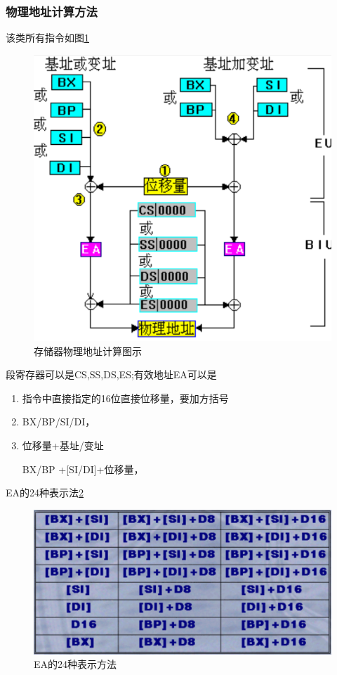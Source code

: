 \subsubsection{物理地址计算方法}
该类所有指令如图\ref{存储器物理地址计算图示}
\begin{figure}[H]\label{存储器物理地址计算图示}
    \centering 
    \includegraphics[scale=1]{part_指令系统/part_指令系统_pic/存储器物理地址计算图示.png}
    \caption{存储器物理地址计算图示}
\end{figure}
段寄存器可以是CS,SS,DS,ES;有效地址EA可以是
\begin{enumerate}
    \item 指令中直接指定的16位直接位移量，要加方括号
    \item BX/BP/SI/DI，{\color{red}{出现BP（不管是源处还是目的处）时默认使用SS提供段基址，但允许使用段超越前缀将SS修改为CS/DS/E，没有BP的，默认使用DS}}
    \item 位移量+基址/变址
    \item [BX/BP]+[SI/DI]+位移量，{\color{red}{画斜线的两者不能同时出现}}
\end{enumerate}
EA的24种表示法\ref{EA的24种表示方法}
\begin{figure}[H]
    \centering 
    \includegraphics[scale=1]{part_指令系统/part_指令系统_pic/EA的24种表示方法.png}
    \caption{EA的24种表示方法}
    \label{EA的24种表示方法}
\end{figure}
